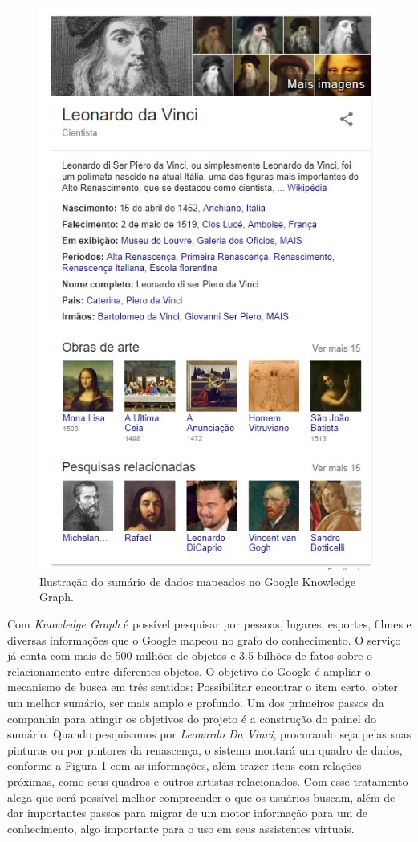 \begin{figure}
	\centering
	\includegraphics[scale=0.8]{imagens/knowledge_graph.jpg}
	\caption{Ilustração do sumário de dados mapeados no Google Knowledge Graph.}
	\label{fig:knowledge-graph}
\end{figure}

Com \textit{Knowledge Graph} é possível pesquisar por pessoas, lugares, esportes, filmes e diversas informações que o Google mapeou no grafo do conhecimento. O serviço já conta com mais de 500 milhões de objetos e 3.5 bilhões de fatos sobre o relacionamento entre diferentes objetos. O objetivo do Google é ampliar o mecanismo de busca em três sentidos: Possibilitar encontrar o item certo, obter um melhor sumário, ser mais amplo e profundo. Um dos primeiros passos da companhia para atingir os objetivos do projeto é a construção do painel do sumário. Quando pesquisamos por \textit{Leonardo Da Vinci}, procurando seja pelas suas pinturas ou por pintores da renascença, o sistema montará um quadro de dados, conforme a Figura \ref{fig:knowledge-graph} com as informações, além trazer itens com relações próximas, como seus quadros e outros artistas relacionados. Com esse tratamento \cite{GoogleKnowledge} alega que será possível melhor compreender o que os usuários buscam, além de dar importantes passos para migrar de um motor informação para um de conhecimento, algo importante para o uso em seus assistentes virtuais.

